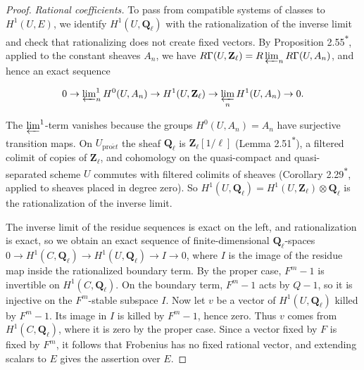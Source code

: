 \documentclass[11pt]{article}
\newcommand{\bpout}[1]{#1\textsuperscript{\hyperlink{bp-outside}{\ensuremath{\ast}}}}
\begin{document}
\begin{proof}[{Proof}]
\emph{Rational coefficients.} To pass from compatible systems of classes to \(H^1(U,E)\), we identify \(H^1(U,\mathbf Q_\ell)\) with the rationalization of the inverse limit and check that rationalizing does not create fixed vectors. By Proposition \bpout{2.55}, applied to the constant sheaves \(A_n\), we have \(R\Gamma(U,\mathbf Z_\ell)=R\varprojlim_nR\Gamma(U,A_n)\), and hence an exact sequence

\[
0\to\varprojlim\nolimits^1_nH^0(U,A_n)\to H^1(U,\mathbf Z_\ell)
\to\varprojlim_nH^1(U,A_n)\to0.
\]

The \(\varprojlim^1\)-term vanishes because the groups \(H^0(U,A_n)=A_n\) have surjective transition maps.  On \(U_{\mathrm{pro}\acute{e}t}\) the sheaf \(\mathbf Q_\ell\) is \(\mathbf Z_\ell[1/\ell]\) (Lemma \bpout{2.51}), a filtered colimit of copies of \(\mathbf Z_\ell\), and cohomology on the quasi-compact and quasi-separated scheme \(U\) commutes with filtered colimits of sheaves (Corollary \bpout{2.29}, applied to sheaves placed in degree zero).  So \(H^1(U,\mathbf Q_\ell)=H^1(U,\mathbf Z_\ell)\otimes\mathbf Q_\ell\) is the rationalization of the inverse limit.

The inverse limit of the residue sequences is exact on the left, and rationalization is exact, so we obtain an exact sequence of finite-dimensional \(\mathbf Q_\ell\)-spaces \(0\to H^1(C,\mathbf Q_\ell)\to H^1(U,\mathbf Q_\ell)\to I\to0\), where \(I\) is the image of the residue map inside the rationalized boundary term. By the proper case, \(F^m-1\) is invertible on \(H^1(C,\mathbf Q_\ell)\). On the boundary term, \(F^m-1\) acts by \(Q-1\), so it is injective on the \(F^m\)-stable subspace \(I\). Now let \(v\) be a vector of \(H^1(U,\mathbf Q_\ell)\) killed by \(F^m-1\). Its image in \(I\) is killed by \(F^m-1\), hence zero. Thus \(v\) comes from \(H^1(C,\mathbf Q_\ell)\), where it is zero by the proper case. Since a vector fixed by \(F\) is fixed by \(F^m\), it follows that Frobenius has no fixed rational vector, and extending scalars to \(E\) gives the assertion over \(E\).
\end{proof}


\end{document}
